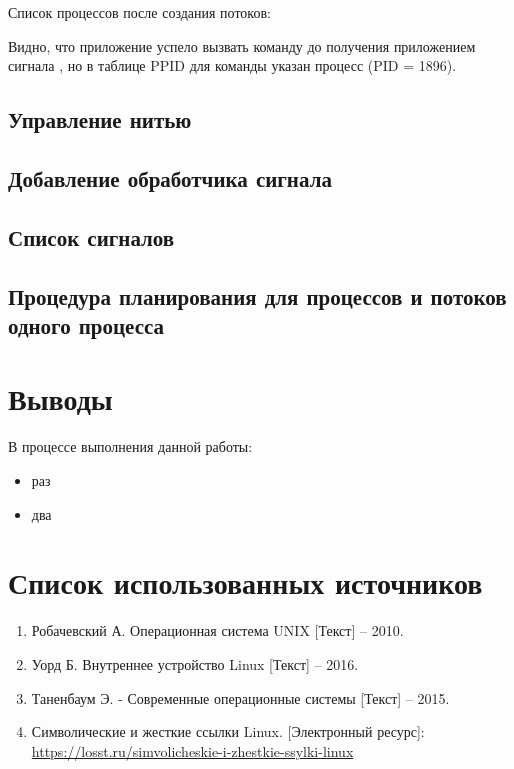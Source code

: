 Список процессов после создания потоков:



Видно, что приложение успело вызвать команду  до получения приложением сигнала , но в таблице PPID для команды  указан процесс  (PID = 1896).

\subsection{Управление нитью}

\subsection{Добавление обработчика сигнала}

\subsection{Список сигналов}

\subsection{Процедура планирования для процессов и потоков одного процесса}

\section{Выводы}

В процессе выполнения данной работы:
\begin{itemize}
	\item раз
	\item два
\end{itemize}

\section*{Список использованных источников}

\begin{enumerate}
	\item Робачевский А. Операционная система UNIX [Текст] -- 2010.
	\item Уорд Б. Внутреннее устройство Linux [Текст] -- 2016.
	\item Таненбаум Э. - Современные операционные системы [Текст] -- 2015.
	\item Символические и жесткие ссылки Linux. [Электронный ресурс]:\\
		\url{https://losst.ru/simvolicheskie-i-zhestkie-ssylki-linux}
\end{enumerate}


